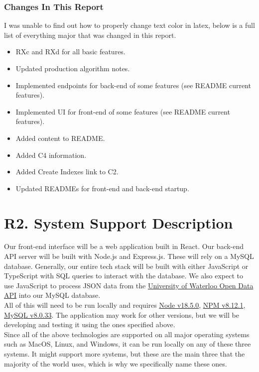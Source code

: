 \documentclass[12pt, a4paper]{article}
\begin{document}
\subsubsection*{Changes In This Report}
I was unable to find out how to properly change text color in latex, below is a full list of everything major that was changed in this report.
\begin{itemize}
    \item RXc and RXd for all basic features.
    \item Updated production algorithm notes.
    \item Implemented endpoints for back-end of some features (see README current features).
    \item Implemented UI for front-end of some features (see README current features).
    \item Added content to README.
    \item Added C4 information.
    \item Added Create Indexes link to C2.
    \item Updated READMEs for front-end and back-end startup.
\end{itemize}
\section*{R2. System Support Description}
\label{sec:R2}

Our front-end interface will be a web application built in React. Our back-end API server will be built with Node.js and Express.js. These will rely on a MySQL database. Generally, our entire tech stack will be built with either JavaScript or TypeScript with SQL queries to interact with the database. We also expect to use JavaScript to process JSON data from the \href{https://openapi.data.uwaterloo.ca/api-docs/index.html}{University of Waterloo Open Data API} into our MySQL database.\\

All of this will need to be run locally and requires \href{https://nodejs.org/en/download}{Node v18.5.0}, \href{https://nodejs.org/en/download}{NPM v8.12.1}, \href{https://dev.mysql.com/downloads/mysql/}{MySQL v8.0.33}. The application may work for other versions, but we will be developing and testing it using the ones specified above.\\

Since all of the above technologies are supported on all major operating systems such as MacOS, Linux, and Windows, it can be run locally on any of these three systems. It might support more systems, but these are the main three that the majority of the world uses, which is why we specifically name these ones.
\end{document}
